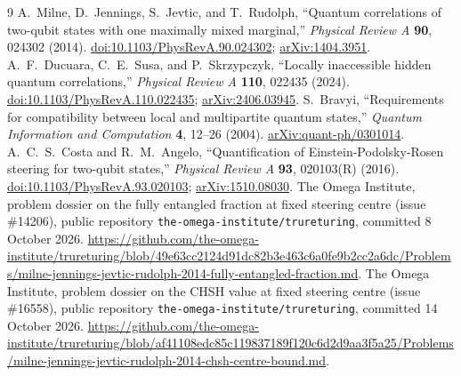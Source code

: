 \documentclass[11pt]{article}
\begin{document}
\begin{thebibliography}{9}
 A.~Milne, D.~Jennings, S.~Jevtic, and T.~Rudolph,
``Quantum correlations of two-qubit states with one maximally mixed marginal,''
\emph{Physical Review A} \textbf{90}, 024302 (2014).
\href{https://doi.org/10.1103/PhysRevA.90.024302}{doi:10.1103/PhysRevA.90.024302};
\href{https://arxiv.org/abs/1404.3951}{arXiv:1404.3951}.
 A.~F.~Ducuara, C.~E.~Susa, and P.~Skrzypczyk,
``Locally inaccessible hidden quantum correlations,''
\emph{Physical Review A} \textbf{110}, 022435 (2024).
\href{https://doi.org/10.1103/PhysRevA.110.022435}{doi:10.1103/PhysRevA.110.022435};
\href{https://arxiv.org/abs/2406.03945}{arXiv:2406.03945}.
 S.~Bravyi, ``Requirements for compatibility between local and multipartite quantum states,''
\emph{Quantum Information and Computation} \textbf{4}, 12--26 (2004).
\href{https://arxiv.org/abs/quant-ph/0301014}{arXiv:quant-ph/0301014}.
 A.~C.~S.~Costa and R.~M.~Angelo,
``Quantification of Einstein-Podolsky-Rosen steering for two-qubit states,''
\emph{Physical Review A} \textbf{93}, 020103(R) (2016).
\href{https://doi.org/10.1103/PhysRevA.93.020103}{doi:10.1103/PhysRevA.93.020103};
\href{https://arxiv.org/abs/1510.08030}{arXiv:1510.08030}.
 The Omega Institute, problem dossier on the fully entangled fraction at fixed steering centre (issue \#14206), public repository \nolinkurl{the-omega-institute/trureturing}, committed 8 October 2026.
\url{https://github.com/the-omega-institute/trureturing/blob/49e63cc2124d91dc82b3e463c6a0fe9b2cc2a6dc/Problems/milne-jennings-jevtic-rudolph-2014-fully-entangled-fraction.md}.
 The Omega Institute, problem dossier on the CHSH value at fixed steering centre (issue \#16558), public repository \nolinkurl{the-omega-institute/trureturing}, committed 14 October 2026.
\url{https://github.com/the-omega-institute/trureturing/blob/af41108edc85c119837189f120c6d2d9aa3f5a25/Problems/milne-jennings-jevtic-rudolph-2014-chsh-centre-bound.md}.
\end{thebibliography}
\end{document}
